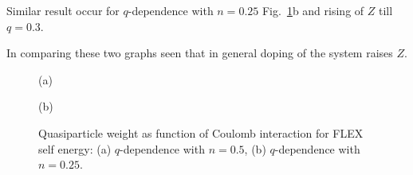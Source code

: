 Similar result occur for $q$-dependence with $n=0.25$ Fig.~\ref{fig:2_orb_Z_u_J}b and rising of $Z$ till $q=0.3$. 

In comparing these two graphs seen that in general doping of the system raises $Z$.
\begin{figure}[h!]
\begin{minipage}[h]{0.5\linewidth}
 (a) \\
\end{minipage}
\hfill
\begin{minipage}[h]{0.5\linewidth}
 (b) \\
\end{minipage}
\caption{Quasiparticle weight as function of Coulomb interaction for FLEX self energy: (a) $q$-dependence with $n=0.5$, (b) $q$-dependence with $n=0.25$.}
\label{fig:2_orb_Z_u_J}
\end{figure}

